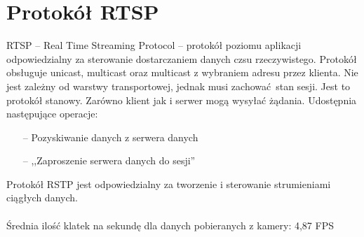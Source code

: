 \documentclass[a4paper, 12pt, titlepage]{article}
\begin{document}
    \section{Protokół RTSP}
        RTSP -- Real Time Streaming Protocol -- protokół poziomu aplikacji 
        odpowiedzialny za sterowanie dostarczaniem danych czsu rzeczywistego.
        Protokół obsługuje unicast, multicast oraz multicast z wybraniem
        adresu przez klienta. Nie jest zależny od warstwy transportowej,
        jednak musi zachować stan sesji. Jest to protokół stanowy. Zarówno 
        klient jak i serwer mogą wysyłać żądania.
        Udostępnia następujące operacje:
        \begin{itemize}
            \item[--] Pozyskiwanie danych z serwera danych
            \item[--] ,,Zaproszenie serwera danych do sesji''
        \end{itemize}
        Protokół RSTP jest odpowiedzialny za tworzenie i sterowanie
        strumieniami ciągłych danych.
        \\ \\
        Średnia ilość klatek na sekundę dla danych pobieranych z kamery:
        4,87 FPS
\end{document}
